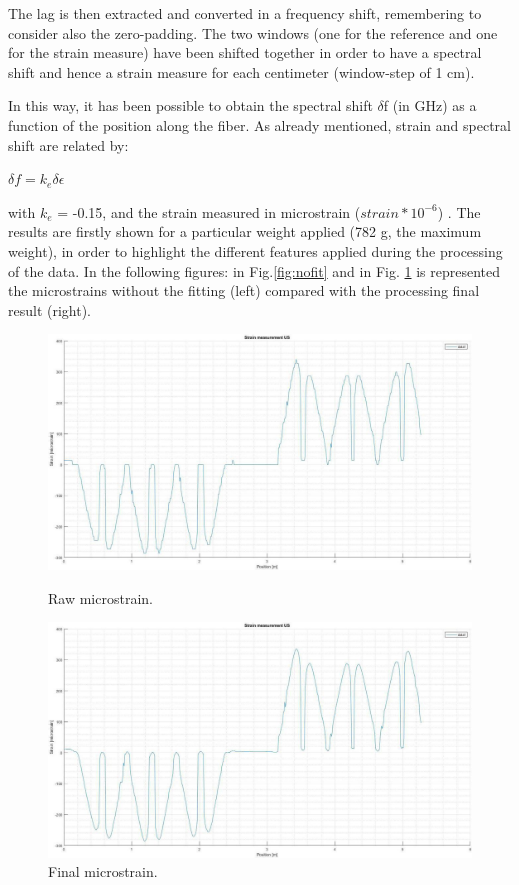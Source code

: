 The lag is then extracted and converted in a frequency shift, remembering to consider also the zero-padding.
The two windows (one for the reference and one for the strain measure) have been shifted together in order to have a spectral shift and hence a strain measure for each centimeter (window-step of 1 cm).

In this way, it has been possible to obtain the spectral shift $\delta$f (in GHz) as a function of the position along the fiber. As already mentioned, strain and spectral shift are related by:
\begin{center}
$ \delta f=k_{e}\delta \epsilon $
\end{center}
with $k_{e}$ = -0.15, and the strain measured in microstrain ($strain*10^{-6}$) . The results are firstly shown for a particular weight applied (782 g, the maximum weight), in order to highlight the different features applied during the processing of the data. In the following figures: in Fig.\ref{fig:nofit} and in Fig. \ref{fig:final} is represented the microstrains without the fitting (left) compared with the processing final result (right).

\begin{figure}[H]
    \centering
    \includegraphics[scale=0.25]{img/nofit.jpg}
    \caption{Raw microstrain.}
    \label{fig:nofit}
    \endminipage\hfill
    \centering
    \includegraphics[scale=0.25]{img/final.jpg}
    \caption{Final microstrain.}
    \label{fig:final}
    \endminipage
\end{figure}

